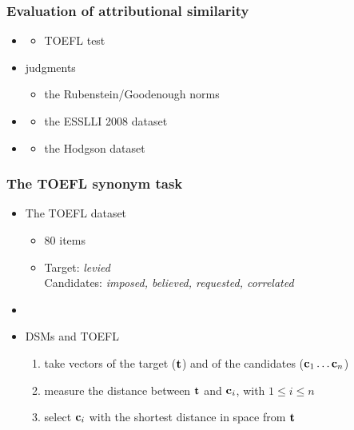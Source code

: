 \begin{frame}
  \frametitle{Evaluation of attributional similarity}
  
  \begin{itemize}
  \item {}
  \begin{itemize}
\item TOEFL test
\end{itemize}
  \item {}
    judgments
   \begin{itemize}
\item the Rubenstein/Goodenough norms
\end{itemize}
  \item {}
  \begin{itemize}
\item the ESSLLI 2008 dataset
\end{itemize}
  \item {}
  \begin{itemize}
\item the Hodgson  dataset
\end{itemize}

  \end{itemize}
\end{frame}



\begin{frame}\frametitle{The TOEFL synonym task}

  \begin{itemize}
  \item The TOEFL dataset
  \begin{itemize}
  \item<1-> 80 items
  \item<1-> Target: \emph{levied}\\
    Candidates:
    \emph{\alert<2->{imposed}, believed, requested, correlated}
    \end{itemize}
    \item[]
  \item<3-> DSMs and TOEFL
  \begin{enumerate}
\item take vectors of the target ($\Vector{t}$) and of the candidates
($\Vector{c}_1 \dots \Vector{c}_n$)
\item measure the distance between $\Vector{t}$ and $\Vector{c}_i$, with
$1 \leq i \leq n$ 
\item select $\Vector{c}_i$ with the shortest distance in space from $\Vector{t}$
\end{enumerate}
  \end{itemize}

\end{frame}


